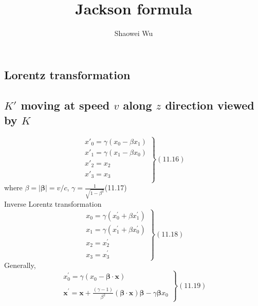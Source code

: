 \documentclass[10pt, oneside]{article}   	%
\title{Jackson formula}
\author{Shaowei Wu}
\begin{document}
\maketitle
\begin{multicols}{2}
\setlength{\columnseprule}{0.4pt}

\section{Lorentz transformation}


\subsection{$K'$ moving at speed $v$ along $z$ direction viewed by $K$}
$$
\left.\begin{array}{l}
  x'_0=\gamma (x_0- \beta x_1)\\
  x'_1=\gamma (x_1- \beta x_0)\\
  x'_2=x_2\\
  x'_3=x_3\\
\end{array}\right\}(11.16)
$$
where $\beta=|\boldsymbol{\beta}|=v/c$, $\gamma=\frac{1}{\sqrt{1-\beta ^2}}$\quad(11.17)\\
Inverse Lorentz transformation
$$
\left.\begin{array}{l}
x_{0}=\gamma\left(x_{0}^{\prime}+\beta x_{1}^{\prime}\right) \\ 
x_{1}=\gamma\left(x_{1}^{\prime}+\beta x_{0}^{\prime}\right) \\ 
x_{2}=x_{2}^{\prime} \\
x_{3}=x_{3}^{\prime}
\end{array}\right\}(11.18)
$$
Generally, 
$$
\left.\begin{array}{l}
x_{0}^{\prime}=\gamma\left(x_{0}-\boldsymbol{\beta} \cdot \mathbf{x}\right) \\ \\
\mathbf{x}^{\prime}=\mathbf{x}+\frac{(\gamma-1)}{\beta^{2}}(\boldsymbol{\beta} \cdot \mathbf{x}) \boldsymbol{\beta}-\gamma \boldsymbol{\beta} x_{0}
\end{array}\right\}(11.19)
$$



\end{multicols}
\end{document}
